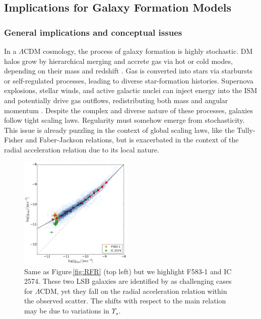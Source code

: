 \documentclass[apjl, twocolappendix]{emulateapj}
\begin{document}
\subsection{Implications for Galaxy Formation Models}

\subsubsection{General implications and conceptual issues}

In a $\Lambda$CDM cosmology, the process of galaxy formation is highly stochastic. DM halos grow by hierarchical merging and accrete gas via hot or cold modes, depending on their mass and redshift \citep{Dekel2006}. Gas is converted into stars via starbursts or self-regulated processes, leading to diverse star-formation histories. Supernova explosions, stellar winds, and active galactic nuclei can inject energy into the ISM and potentially drive gas outflows, redistributing both mass and angular momentum \citep{Governato2010, Madau2014, DiCintio2014}. Despite the complex and diverse nature of these processes, galaxies follow tight scaling laws. Regularity must somehow emerge from stochasticity. This issue is already puzzling in the context of global scaling laws, like the Tully-Fisher and Faber-Jackson relations, but is exacerbated in the context of the radial acceleration relation due to its local nature.

\begin{figure}[thb]
\centering
\includegraphics[width=0.48\textwidth]{RAR_Oman.pdf}
\caption{Same as Figure\,\ref{fig:RFR} (top left) but we highlight F583-1 and IC\,2574. These two LSB galaxies are identified by \citet{Oman2015} as challenging cases for $\Lambda$CDM, yet they fall on the radial acceleration relation within the observed scatter. The shifts with respect to the main relation may be due to variations in $\Upsilon_{\star}$.}
\label{fig:Oman}
\end{figure}
\end{document}
